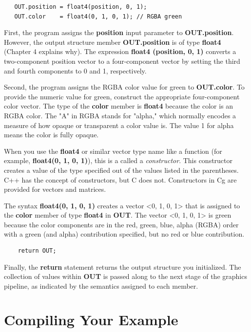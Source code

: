 \documentclass{book}
\begin{document}
\FloatBarrier
\begin{lstlisting}
   OUT.position = float4(position, 0, 1);
   OUT.color    = float4(0, 1, 0, 1); // RGBA green
\end{lstlisting}
\FloatBarrier

First, the program assigns the \textbf{position} input parameter to \textbf{OUT.position}. However, the output structure member \textbf{OUT.position} is of type \textbf{float4} (Chapter 4 explains why). The expression \textbf{float4 (position, 0, 1)} converts a two-component position vector to a four-component vector by setting the third and fourth components to 0 and 1, respectively.

Second, the program assigns the RGBA color value for green to \textbf{OUT.color}. To provide the numeric value for green, construct the appropriate four-component color vector. The type of the \textbf{color} member is \textbf{float4} because the color is an RGBA color. The "A" in RGBA stands for "alpha," which normally encodes a measure of how opaque or transparent a color value is. The value 1 for alpha means the color is fully opaque.

When you use the \textbf{float4} or similar vector type name like a function (for example, \textbf{float4(0, 1, 0, 1)}), this is a called a \textit{constructor}. This constructor creates a value of the type specified out of the values listed in the parentheses. C++ has the concept of constructors, but C does not. Constructors in Cg are provided for vectors and matrices.

The syntax \textbf{float4(0, 1, 0, 1)} creates a vector <0, 1, 0, 1> that is assigned to the \textbf{color} member of type \textbf{float4} in \textbf{OUT}. The vector <0, 1, 0, 1> is green because the color components are in the red, green, blue, alpha (RGBA) order with a green (and alpha) contribution specified, but no red or blue contribution.

\FloatBarrier
\begin{lstlisting}
    return OUT;
\end{lstlisting}
\FloatBarrier

Finally, the \textbf{return} statement returns the output structure you initialized. The collection of values within \textbf{OUT} is passed along to the next stage of the graphics pipeline, as indicated by the semantics assigned to each member.

\section{Compiling Your Example}
\end{document}
